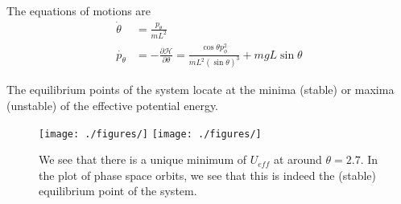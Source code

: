 \documentclass[12pt]{article}
\begin{document}
The equations of motions are
\begin{align*}
	\dot{\theta} &= \frac{p_{\theta}}{ mL^2}\\
	\dot{p_{\theta}} &= -\frac{\partial \mathcal{ H}}{\partial \theta} = \frac{\cos \theta p_{\phi}^2}{mL^2 (\sin \theta)^3} + mgL\sin \theta 
\end{align*}

The equilibrium points of the system locate at the minima (stable) or maxima (unstable) of the effective potential energy. 
~\begin{figure}[H]
	\centering
	\texttt{[image: ./figures/]}
	\texttt{[image: ./figures/]}
	\caption{We see that there is a unique minimum of $ U_{eff}$ at around $ \theta = 2.7$. In the plot of phase space orbits, we see that this is indeed the (stable) equilibrium point of the system.}
\end{figure}
\end{document}
